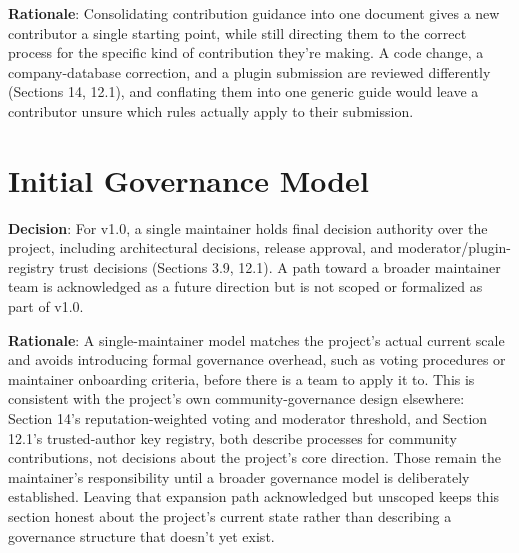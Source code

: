 \textbf{Rationale}: Consolidating contribution guidance into one document gives a new contributor a single starting point, while still directing them to the correct process for the specific kind of contribution they're making. A code change, a company-database correction, and a plugin submission are reviewed differently (Sections 14, 12.1), and conflating them into one generic guide would leave a contributor unsure which rules actually apply to their submission.

\section{Initial Governance Model}

\textbf{Decision}: For v1.0, a single maintainer holds final decision authority over the project, including architectural decisions, release approval, and moderator/plugin-registry trust decisions (Sections 3.9, 12.1). A path toward a broader maintainer team is acknowledged as a future direction but is not scoped or formalized as part of v1.0.

\textbf{Rationale}: A single-maintainer model matches the project's actual current scale and avoids introducing formal governance overhead, such as voting procedures or maintainer onboarding criteria, before there is a team to apply it to. This is consistent with the project's own community-governance design elsewhere: Section 14's reputation-weighted voting and moderator threshold, and Section 12.1's trusted-author key registry, both describe processes for community contributions, not decisions about the project's core direction. Those remain the maintainer's responsibility until a broader governance model is deliberately established. Leaving that expansion path acknowledged but unscoped keeps this section honest about the project's current state rather than describing a governance structure that doesn't yet exist.

\sentinelchapterend